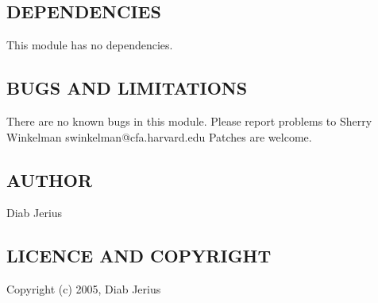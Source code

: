 \documentclass{article}
\begin{document}
\subsection*{DEPENDENCIES\label{Tk::ViewTable_DEPENDENCIES}}


This module has no dependencies.

\subsection*{BUGS AND LIMITATIONS\label{Tk::ViewTable_BUGS_AND_LIMITATIONS}}


There are no known bugs in this module.
Please report problems to Sherry Winkelman swinkelman@cfa.harvard.edu
Patches are welcome.

\subsection*{AUTHOR\label{Tk::ViewTable_AUTHOR}}


Diab Jerius

\subsection*{LICENCE AND COPYRIGHT\label{Tk::ViewTable_LICENCE_AND_COPYRIGHT}}


Copyright (c) 2005, Diab Jerius

\printindex
\end{document}
